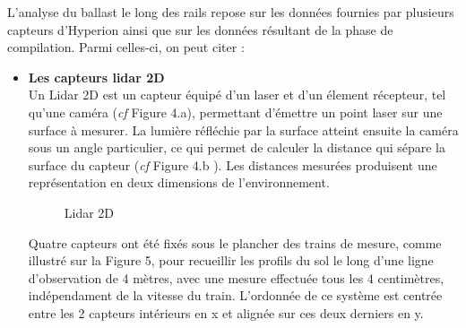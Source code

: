 L'analyse du ballast le long des rails repose sur les données fournies par plusieurs capteurs d'Hyperion ainsi que sur les données résultant de la phase de compilation. Parmi celles-ci, on peut citer :
\begin{itemize}
    \item \textbf{Les capteurs lidar 2D} \\

    
      Un Lidar 2D est un capteur équipé d'un laser et d'un élement récepteur, tel qu'une caméra (\textit{cf} Figure 4.a), permettant d'émettre un point laser sur une surface à mesurer. La lumière réfléchie par la surface atteint ensuite la caméra sous un angle particulier, ce qui permet de calculer la distance qui sépare la surface du capteur (\textit{cf} Figure 4.b \cite{triangulation}). Les distances mesurées produisent une représentation en deux dimensions de l'environnement. \\

    \begin{figure}[H]
      \centering
      \qquad %
      
      \caption{Lidar 2D}
    \end{figure}

    Quatre capteurs ont été fixés sous le plancher des trains de mesure, comme illustré sur la Figure 5,  pour recueillir les profils du sol le long d'une ligne d'observation de 4 mètres, avec une mesure effectuée tous les 4 centimètres, indépendament de la vitesse du train. L'ordonnée de ce système est centrée entre les 2 capteurs intérieurs en x et alignée sur ces deux derniers en y.



\end{itemize}
